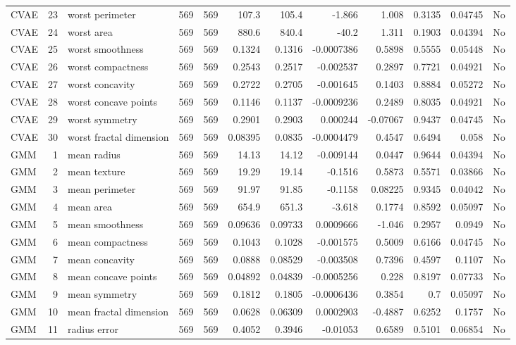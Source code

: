 \begin{longtable}{lrp{}rrrrrrrrl}
CVAE & 23 & worst perimeter & 569 & 569 & 107.3 & 105.4 & -1.866 & 1.008 & 0.3135 & 0.04745 & No \\
CVAE & 24 & worst area & 569 & 569 & 880.6 & 840.4 & -40.2 & 1.311 & 0.1903 & 0.04394 & No \\
CVAE & 25 & worst smoothness & 569 & 569 & 0.1324 & 0.1316 & -0.0007386 & 0.5898 & 0.5555 & 0.05448 & No \\
CVAE & 26 & worst compactness & 569 & 569 & 0.2543 & 0.2517 & -0.002537 & 0.2897 & 0.7721 & 0.04921 & No \\
CVAE & 27 & worst concavity & 569 & 569 & 0.2722 & 0.2705 & -0.001645 & 0.1403 & 0.8884 & 0.05272 & No \\
CVAE & 28 & worst concave points & 569 & 569 & 0.1146 & 0.1137 & -0.0009236 & 0.2489 & 0.8035 & 0.04921 & No \\
CVAE & 29 & worst symmetry & 569 & 569 & 0.2901 & 0.2903 & 0.000244 & -0.07067 & 0.9437 & 0.04745 & No \\
CVAE & 30 & worst fractal dimension & 569 & 569 & 0.08395 & 0.0835 & -0.0004479 & 0.4547 & 0.6494 & 0.058 & No \\
GMM & 1 & mean radius & 569 & 569 & 14.13 & 14.12 & -0.009144 & 0.0447 & 0.9644 & 0.04394 & No \\
GMM & 2 & mean texture & 569 & 569 & 19.29 & 19.14 & -0.1516 & 0.5873 & 0.5571 & 0.03866 & No \\
GMM & 3 & mean perimeter & 569 & 569 & 91.97 & 91.85 & -0.1158 & 0.08225 & 0.9345 & 0.04042 & No \\
GMM & 4 & mean area & 569 & 569 & 654.9 & 651.3 & -3.618 & 0.1774 & 0.8592 & 0.05097 & No \\
GMM & 5 & mean smoothness & 569 & 569 & 0.09636 & 0.09733 & 0.0009666 & -1.046 & 0.2957 & 0.0949 & No \\
GMM & 6 & mean compactness & 569 & 569 & 0.1043 & 0.1028 & -0.001575 & 0.5009 & 0.6166 & 0.04745 & No \\
GMM & 7 & mean concavity & 569 & 569 & 0.0888 & 0.08529 & -0.003508 & 0.7396 & 0.4597 & 0.1107 & No \\
GMM & 8 & mean concave points & 569 & 569 & 0.04892 & 0.04839 & -0.0005256 & 0.228 & 0.8197 & 0.07733 & No \\
GMM & 9 & mean symmetry & 569 & 569 & 0.1812 & 0.1805 & -0.0006436 & 0.3854 & 0.7 & 0.05097 & No \\
GMM & 10 & mean fractal dimension & 569 & 569 & 0.0628 & 0.06309 & 0.0002903 & -0.4887 & 0.6252 & 0.1757 & No \\
GMM & 11 & radius error & 569 & 569 & 0.4052 & 0.3946 & -0.01053 & 0.6589 & 0.5101 & 0.06854 & No \\

\end{longtable}
